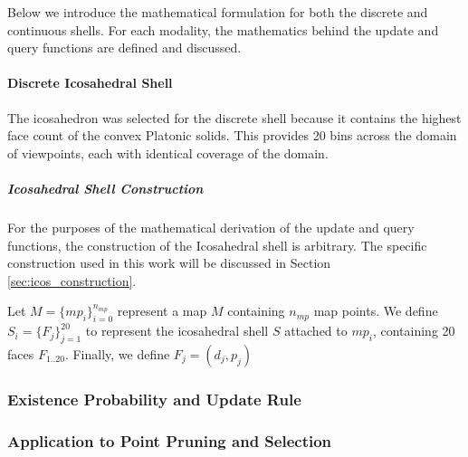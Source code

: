 Below we introduce the mathematical formulation for both the discrete and continuous shells. For each modality, the mathematics behind the update and query functions are defined and discussed.

\paragraph{Discrete Icosahedral Shell}

The icosahedron was selected for the discrete shell because it contains the highest face count of the convex Platonic solids. This provides 20 bins across the domain of viewpoints, each with identical coverage of the domain.

\subparagraph{Icosahedral Shell Construction}

For the purposes of the mathematical derivation of the update and query functions, the construction of the Icosahedral shell is arbitrary. The specific construction used in this work will be discussed in Section \ref{sec:icos_construction}.

Let $M=\{mp_i\}_{i=0}^{n_{mp}}$ represent a map $M$ containing $n_{mp}$ map points. We define $S_i=\{F_j\}_{j=1}^{20}$ to represent the icosahedral shell $S$ attached to $mp_i$, containing 20 faces $F_{1..20}$. Finally, we define $F_j=(d_j, p_j)$


\subsubsection{Existence Probability and Update Rule}

\subsubsection{Application to Point Pruning and Selection}
